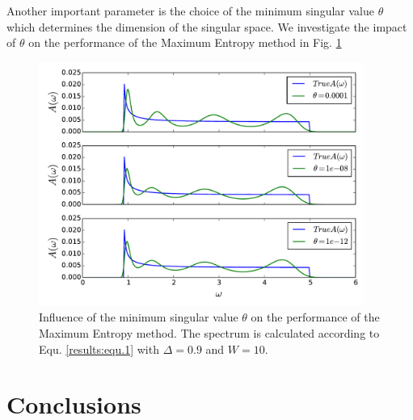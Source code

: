 \documentclass[10pt,letterpaper]{article}
\begin{document}
\FloatBarrier
Another important parameter is the choice of the minimum singular value $\theta$ which determines the dimension of the singular space. We investigate the impact of $\theta$ on the performance of the Maximum Entropy method in Fig. \ref{results:fig.3}
\begin{figure}[htbp]
	\centering
	\includegraphics[width=0.95\textwidth]{./images/BCS_varying_cutoffs.pdf}
	\caption{Influence of the minimum singular value $\theta$ on the performance of the Maximum Entropy method. The spectrum is calculated according to Equ. \ref{results:equ.1} with $\Delta = 0.9$ and $W = 10$.}
	\label{results:fig.3}
\end{figure}
\FloatBarrier
\section{Conclusions} %
\label{sec:conclusions}
\end{document}
